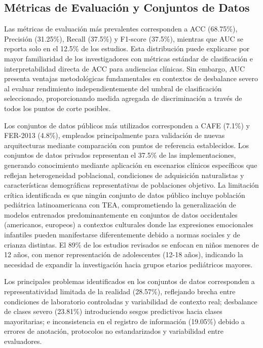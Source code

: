 \documentclass{ieeeaccess}
\begin{document}
	\subsection{Métricas de Evaluación y Conjuntos de Datos}
	
	Las métricas de evaluación más prevalentes corresponden a ACC (68.75\%), Precisión (31.25\%), Recall (37.5\%) y F1-score (37.5\%), mientras que AUC se reporta solo en el 12.5\% de los estudios. Esta distribución puede explicarse por mayor familiaridad de los investigadores con métricas estándar de clasificación e interpretabilidad directa de ACC para audiencias clínicas. Sin embargo, AUC presenta ventajas metodológicas fundamentales en contextos de desbalance severo al evaluar rendimiento independientemente del umbral de clasificación seleccionado, proporcionando medida agregada de discriminación a través de todos los puntos de corte posibles.
	
	Los conjuntos de datos públicos más utilizados corresponden a CAFE (7.1\%) y FER-2013 (4.8\%), empleados principalmente para validación de nuevas arquitecturas mediante comparación con puntos de referencia establecidos. Los conjuntos de datos privados representan el 37.5\% de las implementaciones, generando conocimiento mediante aplicación en escenarios clínicos específicos que reflejan heterogeneidad poblacional, condiciones de adquisición naturalistas y características demográficas representativas de poblaciones objetivo. La limitación crítica identificada es que ningún conjunto de datos público incluye población pediátrica latinoamericana con TEA, comprometiendo la generalización de modelos entrenados predominantemente en conjuntos de datos occidentales (americanos, europeos) a contextos culturales donde las expresiones emocionales infantiles pueden manifestarse diferentemente debido a normas sociales y de crianza distintas. El 89\% de los estudios revisados se enfocan en niños menores de 12 años, con menor representación de adolescentes (12-18 años), indicando la necesidad de expandir la investigación hacia grupos etarios pediátricos mayores.
	
	Los principales problemas identificados en los conjuntos de datos corresponden a representatividad limitada de la realidad (28.57\%), reflejando brecha entre condiciones de laboratorio controladas y variabilidad de contexto real; desbalance de clases severo (23.81\%) introduciendo sesgos predictivos hacia clases mayoritarias; e inconsistencia en el registro de información (19.05\%) debido a errores de anotación, protocolos no estandarizados y variabilidad entre evaluadores.
	
\end{document}
